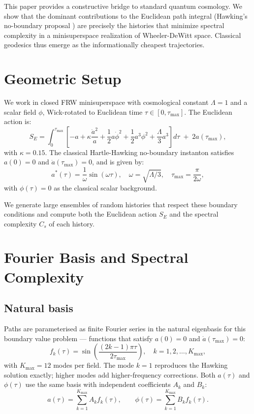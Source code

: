 \documentclass[11pt]{article}
\begin{document}
This paper provides a constructive bridge to standard quantum cosmology.
We show that the dominant contributions to the Euclidean path integral (Hawking's no-boundary proposal
\cite{hawking1979}) are precisely the histories that minimize spectral complexity in a minisuperspace
realization of Wheeler-DeWitt space. Classical geodesics thus emerge as the informationally cheapest trajectories.

\section{Geometric Setup}

We work in closed FRW minisuperspace with cosmological constant \(\Lambda = 1\) and a scalar field \(\phi\),
Wick-rotated to Euclidean time \(\tau \in [0, \tau_{\max}]\). The Euclidean action is:
\[
S_E = \int_0^{\tau_{\max}} \left[ -a + \kappa \frac{\dot{a}^2}{a} + \frac{1}{2} a \dot{\phi}^2 + \frac{1}{2} a^3 \phi^2 + \frac{\Lambda}{3} a^3 \right] d\tau \;+\; 2a(\tau_{\max}),
\]
with \(\kappa = 0.15\). The classical Hartle-Hawking no-boundary instanton satisfies \(a(0) = 0\) and \(\dot{a}(\tau_{\max}) = 0\), and is given by:
\[
a^*(\tau) = \frac{1}{\omega} \sin(\omega \tau), \quad \omega = \sqrt{\Lambda/3}, \quad \tau_{\max} = \frac{\pi}{2\omega},
\]
with \(\phi(\tau) = 0\) as the classical scalar background.

We generate large ensembles of random histories that respect these boundary conditions and compute both the Euclidean action \(S_E\) and the spectral complexity \(C_s\) of each history.

\section{Fourier Basis and Spectral Complexity}

\subsection{Natural basis}

Paths are parameterised as finite Fourier series in the natural eigenbasis for this boundary value
problem — functions that satisfy \(a(0) = 0\) and \(\dot{a}(\tau_{\max}) = 0\):
\[
f_k(\tau) = \sin\!\left(\frac{(2k-1)\pi\tau}{2\tau_{\max}}\right), \quad k = 1, 2, \ldots, K_{\max},
\]
with \(K_{\max} = 12\) modes per field. The mode \(k = 1\) reproduces the Hawking solution exactly; higher modes add higher-frequency corrections. Both \(a(\tau)\) and \(\phi(\tau)\) use the same basis with independent coefficients \(A_k\) and \(B_k\):
\[
a(\tau) = \sum_{k=1}^{K_{\max}} A_k f_k(\tau), \qquad \phi(\tau) = \sum_{k=1}^{K_{\max}} B_k f_k(\tau).
\]
\end{document}
